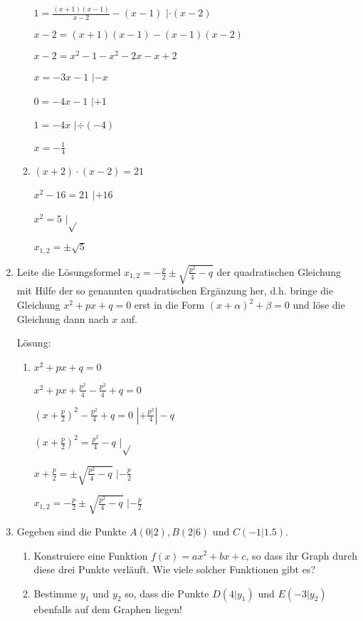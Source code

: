 \documentclass[../main.tex]{subfiles}
\begin{document}
\begin{enumerate}
\begin{enumerate}
		            \(  1 = \frac{ (x+1)(x-1) }{ x-2 } - (x - 1) \) \( | \cdot (x - 2) \)

		            \( x - 2 = (x + 1)(x - 1) - (x - 1) (x - 2) \)

		            \( x-2 = x^2 - 1 - x^2 -2x -x +2 \)

		            \( x  = -3x -1  \) \( | -x  \)

		            \( 0 = -4x -1  \) \( | +1 \)

		            \( 1 = -4x \) \( | \div (-4) \)

		            \( x = -\frac{1}{4} \)
		      \item \( (x + 2) \cdot (x- 2) = 21 \)

		            \( x^2 - 16 = 21 \) \( | +16 \)

		            \( x^2 = 5  \) \( |\sqrt{} \)

		            \( x_{1,2} = \pm \sqrt{5} \)
	      \end{enumerate}
	\item Leite die Lösungsformel \( x_{1,2} = - \frac{p}{2} \pm \sqrt{ \frac{p^2}{4} - q } \)
	      der quadratischen Gleichung mit Hilfe der so genannten quadratischen Ergänzung her,
	      d.h. bringe die Gleichung \( x^2 + px + q = 0 \) erst in die Form
	      \( (x + \alpha)^2 + \beta = 0 \) und löse die Gleichung dann nach \( x \) auf.

	      Lösung:
	      \begin{enumerate}
		      \item \( x^2 + px + q = 0 \)

		            \( x^2 + px + \frac{p^2}{4} - \frac{p^2}{4} + q = 0\)

		            \( (x + \frac{p}{2} )^2 - \frac{p^2}{4} + q = 0 \)  \( |+ \frac{p^2}{4} | - q \)

		            \( (x + \frac{p}{2} )^2 = \frac{p^2}{4} - q \) \( |\sqrt{} \)

		            \( x + \frac{p}{2} = \pm \sqrt{ \frac{p^2}{4} - q }\) \( |- \frac{p}{2} \)

		            \( x_{1,2} = -\frac{p}{2} \pm \sqrt{ \frac{p^2}{4} - q }\) \( |- \frac{p}{2} \)
	      \end{enumerate}
	\item Gegeben sind die Punkte \( A(0|2), B(2|6) \) und \( C(-1|1.5) \).
	      \begin{enumerate}
		      \item Konstruiere eine Funktion \( f(x) = ax^2 + bx + c \), so dass ihr Graph durch
		            diese drei Punkte verläuft.
		            Wie viele solcher Funktionen gibt es?
		      \item Bestimme \( y_1 \) und \( y_2 \) so, dass die Punkte
		            \( D(4|y_1) \) und \( E(-3|y_2) \) ebenfalls auf dem Graphen liegen!
	      \end{enumerate}


\end{enumerate}
\end{document}
